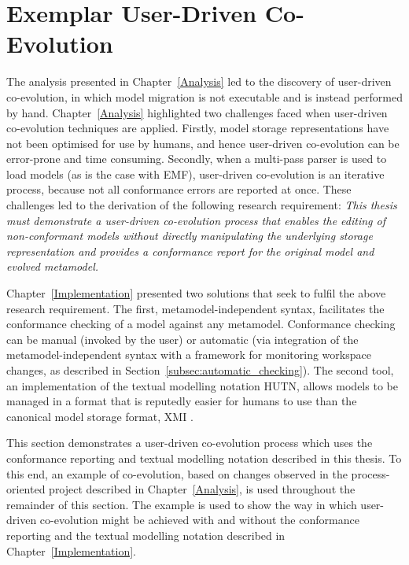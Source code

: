 
\section{Exemplar User-Driven Co-Evolution}
\label{sec:exemplar_user-driven_co-evo}
The analysis presented in Chapter~\ref{Analysis} led to the discovery of user-driven co-evolution, in which model migration is not executable and is instead performed by hand. Chapter~\ref{Analysis} highlighted two challenges faced when user-driven co-evolution techniques are applied. Firstly, model storage representations have not been optimised for use by humans, and hence user-driven co-evolution can be error-prone and time consuming. Secondly, when a multi-pass parser is used to load models (as is the case with EMF), user-driven co-evolution is an iterative process, because not all conformance errors are reported at once. These challenges led to the derivation of the following research requirement: \emph{This thesis must demonstrate a user-driven co-evolution process that enables the editing of non-conformant models without directly manipulating the underlying storage representation and provides a conformance report for the original model and evolved metamodel.}

Chapter~\ref{Implementation} presented two solutions that seek to fulfil the above research requirement. The first, metamodel-independent syntax, facilitates the conformance checking of a model against any metamodel. Conformance checking can be manual (invoked by the user) or automatic (via integration of the metamodel-independent syntax with a framework for monitoring workspace changes, as described in Section~\ref{subsec:automatic_checking}). The second tool, an implementation of the textual modelling notation HUTN, allows models to be managed in a format that is reputedly easier for humans to use than the canonical model storage format, XMI \cite{hutn}.

This section demonstrates a user-driven co-evolution process which uses the conformance reporting and textual modelling notation described in this thesis. To this end, an example of co-evolution, based on changes observed in the process-oriented project described in Chapter~\ref{Analysis}, is used throughout the remainder of this section. The example is used to show the way in which user-driven co-evolution might be achieved with and without the conformance reporting and the textual modelling notation described in Chapter~\ref{Implementation}.

